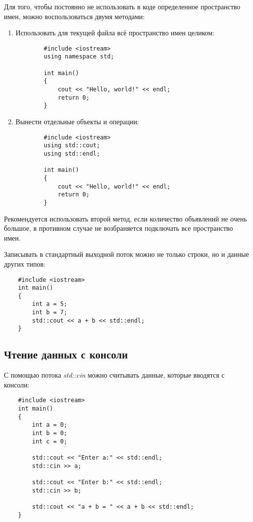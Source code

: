 Для того, чтобы постоянно не использовать в коде определенное пространство имен, можно воспользоваться двумя методами:
\begin{enumerate}
    \item Использовать для текущей файла всё пространство имен целиком:
    \begin{lstlisting}
        #include <iostream>
        using namespace std;

        int main()
        {
            cout << "Hello, world!" << endl;
            return 0;
        }
    \end{lstlisting}

    \item Вынести отдельные объекты и операции:
    \begin{lstlisting}
        #include <iostream>
        using std::cout;
        using std::endl;

        int main()
        {
            cout << "Hello, world!" << endl;
            return 0;
        }
    \end{lstlisting}
\end{enumerate}

Рекомендуется использовать второй метод, если количество объявлений не очень большое, в противном случае не возбраняется подключать все пространство имен.

Записывать в стандартный выходной поток можно не только строки, но и данные других типов:

\begin{lstlisting}
    #include <iostream>
    int main()
    {
        int a = 5;
        int b = 7;
        std::cout << a + b << std::endl;
    }
\end{lstlisting}

\subsection{Чтение данных с консоли}

С помощью потока \textit{std::cin} можно считывать данные, которые вводятся с консоли:
\begin{lstlisting}
    #include <iostream>
    int main()
    {
        int a = 0;
        int b = 0;
        int c = 0;

        std::cout << "Enter a:" << std::endl;
        std::cin >> a;

        std::cout << "Enter b:" << std::endl;
        std::cin >> b;

        std::cout << "a + b = " << a + b << std::endl;
    }
\end{lstlisting}

